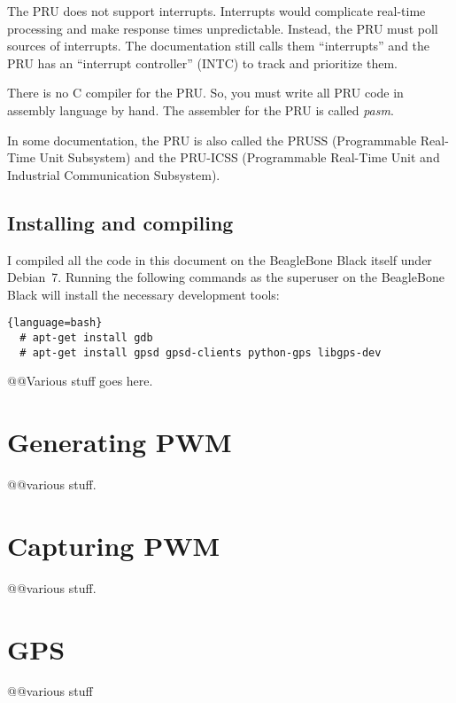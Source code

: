 \documentclass[letterpaper,11pt,fleqn]{article}
\begin{document}
The PRU does not support interrupts. Interrupts would complicate real-time
processing and make response times unpredictable. Instead, the PRU must poll
sources of interrupts. The documentation still calls them ``interrupts'' and 
the PRU has an ``interrupt controller'' (INTC) to track and prioritize them.

There is no C compiler for the PRU. So, you must write all PRU code in
assembly language by hand. The assembler for the PRU is called \textit{pasm}.

In some documentation, the PRU is also called the PRUSS (Programmable
Real-Time Unit Subsystem) and the \mbox{PRU-ICSS} (Programmable Real-Time Unit
and Industrial Communication Subsystem).

\subsection{Installing and compiling}

I compiled all the code in this document on the BeagleBone Black itself under
Debian~7. Running the following commands as the superuser on the BeagleBone
Black will install the necessary development tools:

\begin{lstlisting}{language=bash}
  # apt-get install gdb
  # apt-get install gpsd gpsd-clients python-gps libgps-dev
\end{lstlisting}

@@Various stuff goes here.

\section{Generating PWM}

@@various stuff.

\section{Capturing PWM}

@@various stuff.

\section{GPS}

@@various stuff
\end{document}
